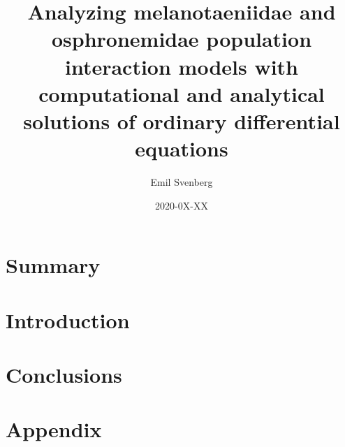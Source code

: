\documentclass{article}
\title{Analyzing melanotaeniidae and osphronemidae population interaction models with computational 
and analytical solutions of ordinary differential equations}
\author{Emil Svenberg}
\date{2020-0X-XX}
\begin{document}
\maketitle
\tableofcontents
\section{Summary}

\section{Introduction}



\section{Conclusions}

\section{Appendix}
\end{document}
